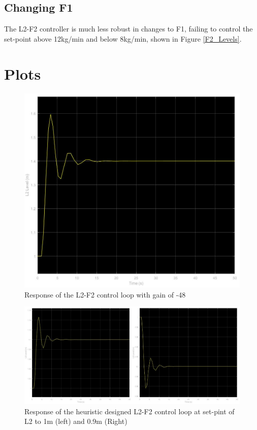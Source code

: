\documentclass[11pt]{article}
\begin{document}
\subsection{Changing F1}
The L2-F2 controller is much less robust in changes to F1, failing to control the set-point above 12kg/min and below 8kg/min, shown in Figure \ref{F2_Levels}.

\appendix

\section{Plots}
\begin{figure} [H]
\centering	\includegraphics[scale = 0.3]
{L2_control_maual}
\caption{Response of the L2-F2 control loop with gain of -48}
\label{L2_man}
\end{figure}

\begin{figure} [H]
\centering	\includegraphics[scale = 0.6]
{L2_setpoints}
\caption{Response of the heuristic designed L2-F2 control loop at set-pint of L2 to 1m (left) and 0.9m (Right)}
\label{L2_setpoints}
\end{figure}
\end{document}
